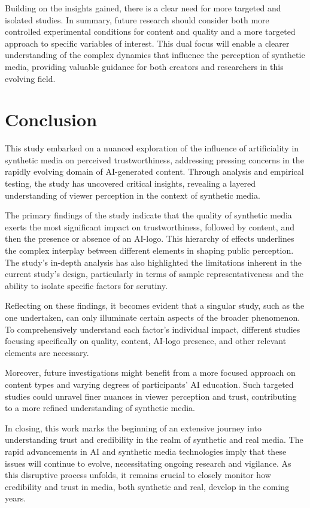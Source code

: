\documentclass[
  a4paper,  %
  twoside,  %
  bibliography=totoc,
  headsepline,
  cleardoublepage=empty,
  parskip=half,
  draft=false
]{scrbook}
\begin{document}
Building on the insights gained, there is a clear need for more targeted and isolated studies. In summary, future research should consider both more controlled experimental conditions for content and quality and a more targeted approach to specific variables of interest. This dual focus will enable a clearer understanding of the complex dynamics that influence the perception of synthetic media, providing valuable guidance for both creators and researchers in this evolving field.

\chapter{Conclusion}
\label{chap:conclusion}

This study embarked on a nuanced exploration of the influence of artificiality in synthetic media on perceived trustworthiness, addressing pressing concerns in the rapidly evolving domain of AI-generated content. Through analysis and empirical testing, the study has uncovered critical insights, revealing a layered understanding of viewer perception in the context of synthetic media.

The primary findings of the study indicate that the quality of synthetic media exerts the most significant impact on trustworthiness, followed by content, and then the presence or absence of an AI-logo. This hierarchy of effects underlines the complex interplay between different elements in shaping public perception. The study's in-depth analysis has also highlighted the limitations inherent in the current study's design, particularly in terms of sample representativeness and the ability to isolate specific factors for scrutiny.

Reflecting on these findings, it becomes evident that a singular study, such as the one undertaken, can only illuminate certain aspects of the broader phenomenon. To comprehensively understand each factor's individual impact, different studies focusing specifically on quality, content, AI-logo presence, and other relevant elements are necessary.

Moreover, future investigations might benefit from a more focused approach on content types and varying degrees of participants' AI education. Such targeted studies could unravel finer nuances in viewer perception and trust, contributing to a more refined understanding of synthetic media.

In closing, this work marks the beginning of an extensive journey into understanding trust and credibility in the realm of synthetic and real media. The rapid advancements in AI and synthetic media technologies imply that these issues will continue to evolve, necessitating ongoing research and vigilance. As this disruptive process unfolds, it remains crucial to closely monitor how credibility and trust in media, both synthetic and real, develop in the coming years.
\end{document}
